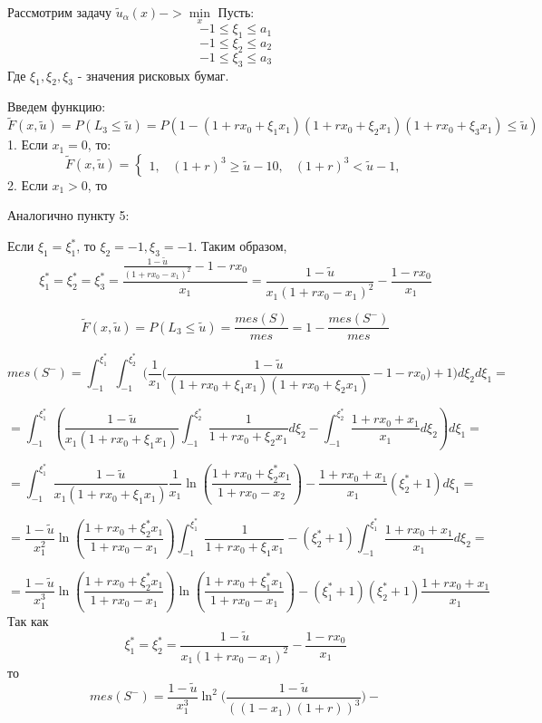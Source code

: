 \documentclass[14pt,a4paper]{article}
\theoremstyle{plain}
\theoremstyle{definition}
\begin{document}
Рассмотрим задачу $\tilde{u}_\alpha(x) -> \min\limits_x$
\vspace{1em}
Пусть:
$$
-1\le \xi_1 \le a_1
$$
$$
-1\le \xi_2 \le a_2
$$
$$
-1\le \xi_3 \le a_3
$$
\vspace{1em}
Где $\xi_1,\xi_2,\xi_3$ - значения рисковых бумаг.

Введем функцию: $\tilde{F}(x,\tilde{u}) = P(L_3 \le \tilde{u}) = P(1-(1+rx_0+\xi_1 x_1)(1+rx_0+\xi_2 x_1)(1+rx_0+\xi_3 x_1)\le \tilde{u})$
\vspace{0.5em}
1. Если $x_1 = 0$, то:
$$
\tilde{F}(x,\tilde{u}) =
\left\{\begin{matrix}
1, &(1+r)^3 \ge \tilde{u}-1
0, &(1+r)^3 < \tilde{u}-1,
\end{matrix}\right.
$$
2. Если $x_1 > 0$, то



\vspace{0.5em}
Аналогично пункту 5:

\vspace{0.5em}
Если $\xi_1 = \xi_1^*$, то $\xi_2 = -1,\xi_3 = -1 $.
Таким образом,
$$
\xi_1^* =\xi_2^*=\xi_3^* =\frac{\frac{1-\tilde{u}}{(1+rx_0-x_1)^2} -1 -rx_0}{x_1} = \frac{ 1-\tilde{u} }{ x_1(1+rx_0-x_1)^2 } - \frac{1 -rx_0}{x_1}
$$

$$\tilde{F}(x,\tilde{u}) = P(L_3 \le \tilde{u})= \frac{mes(S)}{mes} = 1 - \frac{mes(S^-)}{mes}$$

$$
mes(S^-) = \int_{-1}^{\xi_1^*} \int_{-1}^{\xi_2^*} \Big(\frac{1}{x_1} \big(\frac{1-\tilde{u}}{(1+rx_0+\xi_1 x_1)(1+rx_0+\xi_2 x_1)} -1 -rx_0\big)+1\Big)d\xi_2 d\xi_1 =
$$

$$
= \int_{-1}^{\xi_1^*}( \frac{1-\tilde{u}}{x_1(1+rx_0+\xi_1 x_1)}\int_{-1}^{\xi_2^*}\frac{1}{1+rx_0+\xi_2 x_1}d\xi_2 - \int_{-1}^{\xi_2^*}\frac{1+rx_0+ x_1}{x_1}d\xi_2) d\xi_1 =
$$

$$
= \int_{-1}^{\xi_1^*} \frac{1-\tilde{u}}{x_1(1+rx_0+\xi_1 x_1)}\frac{1}{x_1}\ln(\frac{1+rx_0+\xi_2^* x_1}{1+rx_0-x_2}) - \frac{1+rx_0+ x_1}{x_1}(\xi_2^*+1) d\xi_1 =
$$

$$
= \frac{1-\tilde{u}}{x_1^2}\ln(\frac{1+rx_0+\xi_2^* x_1}{1+rx_0-x_1})\int_{-1}^{\xi_1^*}\frac{1}{1+rx_0+\xi_1 x_1}-(\xi_2^*+1)\int_{-1}^{\xi_1^*}\frac{1+rx_0+ x_1}{x_1}d\xi_2 =
$$

$$
= \frac{1-\tilde{u}}{x_1^3}\ln(\frac{1+rx_0+\xi_2^* x_1}{1+rx_0-x_1})\ln(\frac{1+rx_0+\xi_1^* x_1}{1+rx_0-x_1})-(\xi_1^*+1)(\xi_2^*+1)\frac{1+rx_0+x_1}{x_1}
$$
Так как $$\xi_1^* = \xi_2^* = \frac{ 1-\tilde{u} }{ x_1(1+rx_0-x_1)^2 } - \frac{1 -rx_0}{x_1}$$ то
$$
mes(S^-) = \frac{1-\tilde{u}}{x_1^3} \ln^{2}\Big(\frac{1-\tilde{u}}{((1-x_1)(1+r))^3}\Big)-
$$
\end{document}

